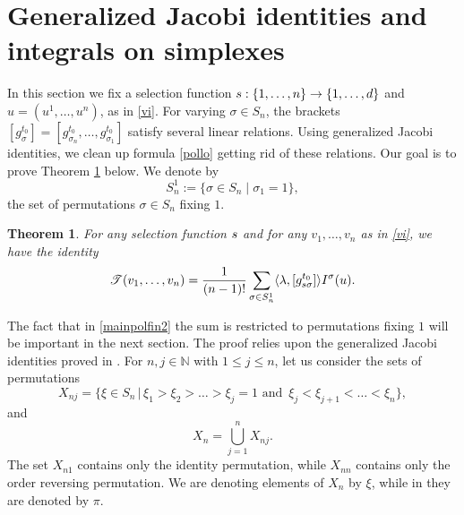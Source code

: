 \documentclass[12pt, reqno]{amsart}
\theoremstyle{plain}
\newtheorem {theorem}{Theorem}[section]
\theoremstyle{definition}
\theoremstyle{remark}
\numberwithin{equation}{section}
\newcommand{\N}{\mathbb{N}}
\newcommand{\T}{\mathcal{T}}
\newcommand{\s}{\sigma}
\newcommand{\0}{\theta}
\newcommand{\1}{{-1}}
\renewcommand{\=}{\coloneqq}
\renewcommand{\.}{\dots}
\begin{document}
 
 
 
 
 
 
 
 
 
 
 
 
 
 
 
 
 
 
 
 
 
 
 
 
 
 
 
 \section{Generalized Jacobi identities and integrals on simplexes}\label{GJI}

In this section we fix a selection function  $\j:\{1,\.,n\}\to\{1,\.,d\}$ and $u=(u^1,\dots,u^n)$, as in   \eqref{vi}.
For varying $\s\in S_n$, the brackets $[g_\s^{t_0}]=  [g_ {\s _n}^{t_0},\.,g_{\s _1} ^{t_0} ]$ satisfy   several linear relations.
Using    generalized Jacobi identities, we  clean up   formula \eqref{pollo} getting rid of these relations.
{\color{black} Our goal  is to prove Theorem \ref{lisk1} below. We denote by
\[
  S_n^1:=  \{\s\in S_n \mid \s_1=1\},
 \]
 the set of permutations $\s\in S_n$ fixing $1$.}

\begin{theorem} \label{lisk1}
For any selection function $s$ and  for any $v_1,\dots,v_n$ as in \eqref{vi}, we have the identity
\begin{equation}
 \label{mainpolfin2}
 \T (v_1,\.,v_n)=\frac{1}{(n-1) !}\sum_{\s\in S_n^1 }
 \langle \lambda, [g^{t_0}_{\j\s } ]\rangle  I^{\sigma}(u) .
\end{equation}
\end{theorem}






 The fact  that in \eqref{mainpolfin2} the sum is restricted to  permutations fixing $1$  will be important in the next section.
The proof relies upon the generalized Jacobi identities proved in \cite{BL88}.
For $n,j\in\N$ with $1\leq j\leq n$, let us consider the sets of permutations
\begin{equation}\label{Xnj}
  X_{nj} =\{\xi\in S_n\,|\,\xi_1>\xi_2>\.>\xi_ j=1 \textrm{ and }\, \xi_ j<\xi_{j+1}<\.<\xi_ n\},
\end{equation}
and
\begin{equation}\label{Xn}
X_n = \bigcup_{j=1}^n X_{nj}.
\end{equation}
 The set $X_{n1}$ contains only the identity permutation, while  $X_{nn}$ contains only the order reversing permutation.
 We are denoting  elements of $X_n$  by $\xi$, while in \cite{BL88} they are denoted by $\pi$.
\end{document}
